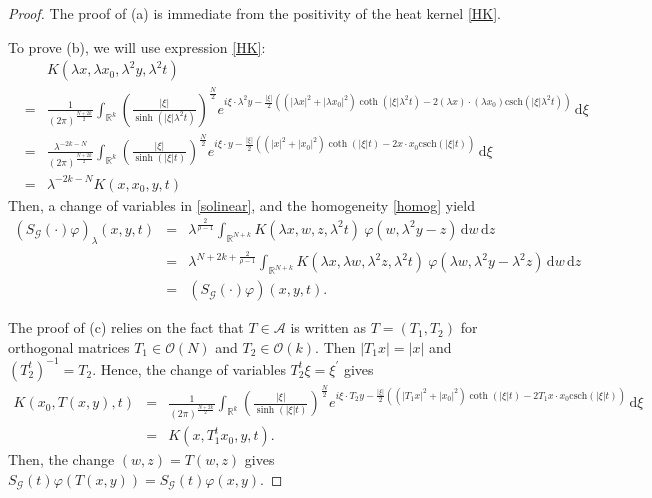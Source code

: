 \documentclass[12pt]{amsart}
\newcommand{\R}{\mathbb{R}}
\newcommand{\di}{\, \mathrm{d}}
\newcommand{\csch}{\mathrm{csch}}
\begin{document}
\begin{proof}
	The proof of (a) is immediate from the positivity of the heat kernel \eqref{HK}.
	
	To prove (b), we will use expression \eqref{HK}:
	\begin{eqnarray*}
		&& K(\lambda x, \lambda x_0, \lambda^2y,\lambda^2 t) \\
		&=& \frac{1}{(2\pi)^{\frac{N+2k}{2}}}\int_{\mathbb{R}^k}\left(\frac{|\xi|}{\sinh(|\xi|\lambda^2t)}\right)^{\frac{N}{2}} e^{i\xi  \cdot \lambda^2 y- \frac{|\xi|}{2}\left((|\lambda x|^2 + |\lambda x_0|^2)  \coth(|\xi| \lambda^2 t) -2 (\lambda x)\cdot (\lambda x_0) \csch(|\xi|\lambda^2 t) \right)} \di\xi\\
		&=& \frac{\lambda^{-2k-N}}{(2\pi)^{\frac{N+2k}{2}}}\int_{\mathbb{R}^k}\left(\frac{|\xi|}{\sinh(|\xi|t)}\right)^{\frac{N}{2}} e^{i\xi  \cdot y- \frac{|\xi|}{2}\left((|x|^2 + |x_0|^2)  \coth(|\xi| t) -2x\cdot x_0 \csch(|\xi|t) \right)} \di\xi\\
		&=&\lambda^{-2k-N}K(x,x_0,y,t)
	\end{eqnarray*}
	Then, a change of variables in \eqref{solinear}, and the homogeneity \eqref{homog} yield
	\begin{eqnarray*}
		(S_\mathcal{G}(\cdot)\varphi)_\lambda(x,y,t) & = &  \lambda^{\frac{2}{\rho-1}} \int_{\R^{N+k}} K(\lambda x,w,z ,\lambda^2 t) \ \varphi(w, \lambda^2 y - z)  \di w \di z \\
		& = &  \lambda^{N+2k+\frac{2}{\rho-1}} \int_{\R^{N+k}} K(\lambda x,\lambda w, \lambda^2z ,\lambda^2 t) \ \varphi(\lambda w, \lambda^2 y - \lambda^2z)  \di w \di z \\
		& = & \left(S_\mathcal{G}(\cdot)\varphi \right)(x,y,t).
	\end{eqnarray*}
	
	The proof of (c) relies on the fact that $T\in\mathcal{A}$ is written as $T=(T_1,T_2)$ for orthogonal matrices $T_1\in \mathcal{O}(N)$ and $T_2\in\mathcal{O}(k)$. Then $|T_1 x|=|x|$ and $(T_2^t)^{-1}=T_2$. Hence, the change of variables $T_2^t \xi = \xi^\prime$ gives
	\begin{eqnarray*}
		K(x_0,T(x,y),t) & = & \frac{1}{(2\pi)^{\frac{N+2k}{2}}} \int_{\mathbb{R}^k} \left(\frac{|\xi|}{\sinh(|\xi|t)}\right)^{\frac{N}{2}} e^{i\xi  \cdot T_2 y- \frac{|\xi|}{2}\left((|T_1x|^2 + |x_0|^2)  \coth(|\xi| t) -2 T_1x \cdot x_0 \csch(|\xi|t) \right)} \di\xi\\
		& = & K(x, T_1^t x_0,y,t) .
	\end{eqnarray*}
	Then, the change $(w,z) = T(w,z)$ gives $S_\mathcal{G}(t)\varphi(T(x,y)) = S_\mathcal{G}(t)\varphi(x,y)$.
\end{proof}
\end{document}
